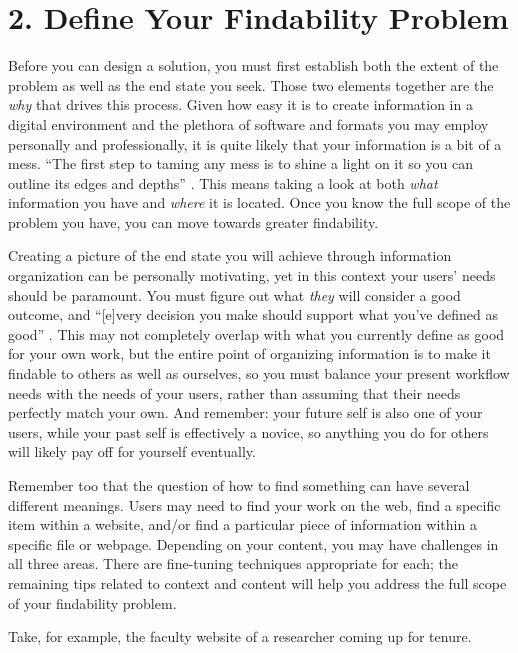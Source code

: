 \documentclass[10pt,letterpaper]{article}
\newcommand{\rulemajor}[1]{\section*{#1}}
\begin{document}
\rulemajor{2. Define Your Findability Problem}

Before you can design a solution, you must first establish both the extent of
the problem as well as the end state you seek. Those two elements together are
the \emph{why} that drives this process. Given how easy it is to create
information in a digital environment and the plethora of software and formats
you may employ personally and professionally, it is quite likely that your
information is a bit of a mess. ``The first step to taming any mess is to shine
a light on it so you can outline its edges and depths'' \cite{Covert2014}. This
means taking a look at both \emph{what} information you have and \emph{where} it
is located.  Once you know the full scope of the problem you have, you can move
towards greater findability.

Creating a picture of the end state you will achieve through information
organization can be personally motivating, yet in this context your users' needs
should be paramount. You must figure out what \emph{they} will consider a good
outcome, and ``[e]very decision you make should support what you've defined as
good'' \cite{Covert2014}. This may not completely overlap with what you
currently define as good for your own work, but the entire point of organizing
information is to make it findable to others as well as ourselves, so you must
balance your present workflow needs with the needs of your users, rather than
assuming that their needs perfectly match your own. And remember: your future
self is also one of your users, while your past self is effectively a novice, so
anything you do for others will likely pay off for yourself eventually.

Remember too that the question of how to find something can have several
different meanings. Users may need to find your work on the web, find a specific
item within a website, and/or find a particular piece of information within a
specific file or webpage. Depending on your content, you may have challenges in
all three areas. There are fine-tuning techniques appropriate for each; the
remaining tips related to context and content will help you address the full
scope of your findability problem.

Take, for example, the faculty website of a researcher coming up for tenure.
\end{document}
